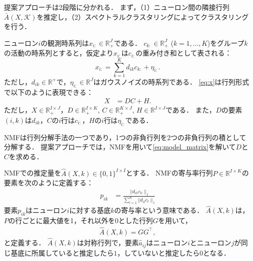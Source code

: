 \documentclass[
  11pt, %
  twocolumn, %
  headings=small, %
]{scrartcl}
\begin{document}
提案アプローチは2段階に分かれる．
まず，（1）ニューロン間の隣接行列$\bar{A}(X,\mathcal{K})$を推定し，（2）スペクトラルクラスタリングによってクラスタリングを行う．

ニューロン$i$の観測時系列は$x_{i:} \in \mathbb{R}_+^{J}$である．
$c_{k:} \in \mathbb{R}^J_+$ ($k=1,\dots,K$)をグループ$k$の活動の時系列とすると，仮定より$x_{i:}$は$c_{i:}$の重み付き和として表される：
\begin{equation}
	x_{i:} = \sum_{k=1}^K d_{ik} c_{k:} + \eta_{i:}.
  \label{eq:x}
\end{equation}
ただし，$d_{ik} \in \mathbb{R}^+$で，$\eta_{i:} \in \mathbb{R}^J$はガウスノイズの時系列である．
\eqref{eq:x}は行列形式で以下のように表現できる：
\begin{align}
  X &= DC + H.
  \label{eq:model_matrix}
\end{align}
ただし，$X \in \mathbb{R}_+^{I \times J}$，$D \in \mathbb{R}_+^{I \times K}$, $C \in \mathbb{R}_+^{K \times J}$, $H \in \mathbb{R}^{I \times J}$である．
また，$D$の要素$(i,k)$は$d_{ik}$，$C$の$i$行は$c_{i:}$，$H$の$i$行は$\eta_{i:}$である．

NMFは行列分解手法の一つであり，1つの非負行列を2つの非負行列の積として分解する．
提案アプローチでは，NMFを用いて\eqref{eq:model_matrix}を解いて$D$と$C$を求める．

NMFでの推定量を$\hat{A}(X, k)\in \{0,1\}^{I \times I}$とする．
NMFの寄与率行列$P \in \mathbb{R}^{I \times K}$の要素を次のように定義する：
\begin{align}
	p_{ik} &= \frac{||d_{ik} c_{k:}||_1}{\sum_{l=1}^K || d_{il} c_{l:} ||_1}
\end{align}
要素$p_{ik}$はニューロン$i$に対する基底$k$の寄与率という意味である．
$\hat{A}(X, k)$は，$P$の行ごとに最大値を1，それ以外を0とした行列$G$を用いて，
\begin{align}
	\hat{A}(X,k) = G G^{\top},
\end{align}
と定義する．
$\hat{A}(X,k)$は対称行列で，要素$\hat{a}_{ij}$はニューロン$i$とニューロン$j$が同じ基底に所属していると推定したら$1$，していないと推定したら$0$となる．
\end{document}
